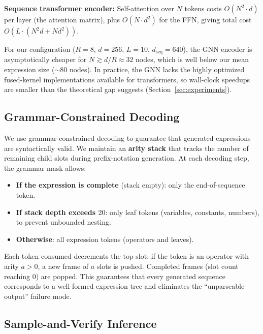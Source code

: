 \documentclass{article}
\begin{document}
\textbf{Sequence transformer encoder:} Self-attention over $N$ tokens
costs $O(N^2 \cdot d)$ per layer (the attention matrix), plus
$O(N \cdot d^2)$ for the FFN, giving total cost $O(L \cdot (N^2 d + N
d^2))$.

For our configuration ($R\!=\!8$, $d\!=\!256$, $L\!=\!10$,
$d_{\text{seq}}\!=\!640$), the GNN encoder is asymptotically cheaper for
$N \gtrsim d/R \approx 32$ nodes, which is well below our mean expression
size ($\sim\!80$ nodes). In practice, the GNN lacks the highly optimized
fused-kernel implementations available for transformers, so wall-clock
speedups are smaller than the theoretical gap suggests
(Section~\ref{sec:experiments}).


\subsection{Grammar-Constrained Decoding}
\label{sec:grammar}

We use grammar-constrained decoding to guarantee that generated expressions
are syntactically valid. We maintain an \textbf{arity stack} that tracks
the number of remaining child slots during prefix-notation generation. At
each decoding step, the grammar mask allows:
\begin{itemize}
	\item \textbf{If the expression is complete} (stack empty): only the
	      end-of-sequence token.
	\item \textbf{If stack depth exceeds $20$}: only leaf tokens (variables,
	      constants, numbers), to prevent unbounded nesting.
	\item \textbf{Otherwise}: all expression tokens (operators and leaves).
\end{itemize}
Each token consumed decrements the top slot; if the token is an operator
with arity $a > 0$, a new frame of $a$ slots is pushed. Completed frames
(slot count reaching $0$) are popped. This guarantees that every generated
sequence corresponds to a well-formed expression tree and eliminates the
``unparseable output'' failure mode.


\subsection{Sample-and-Verify Inference}
\label{sec:sampling}
\end{document}
